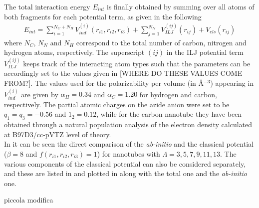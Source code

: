 \documentclass[utf8]{article}
\begin{document}
The total interaction energy $E_{int}$ is finally obtained by summing over all atoms of both fragments for each potential term, as given in the following
%
\begin{align}
    E_{int} = \sum_{i=1}^{N_C + N_H} V^{(i)}_{ind}(r_{i1},r_{i2},r_{i3}) +
              \sum_{j=1}^{N_N} V_{ILJ}^{(ij)}(r_{ij}) + V_{els}(r_{ij})
\end{align}
%
where $N_C$, $N_N$ and $N_H$ correspond to the total number of carbon, nitrogen and hydrogen atoms, respectively.
The superscript $(ij)$ in the ILJ potential term $V_{ILJ}^{(ij)}$ keeps track of the interacting atom types such that the parameters can be accordingly set to the values given in  [WHERE DO THESE VALUES COME FROM?].
The values used for the polarizability per volume (in \AA$^{-3}$) appearing in $V^(i)_{ind}$ are given by $\alpha_H = 0.34$ and $\alpha_C = 1.20$ for hydrogen and carbon, respectively.
The partial atomic charges on the azide anion were set to be $q_1 = q_3 = -0.56$ and $1_2 = 0.12$, while for the carbon nanotube they have been obtained through a natural population analysis\cite{Reed1985a} of the electron density calculated at B97D3/cc-pVTZ level of theory.\\

In  it can be seen the direct comparison of the \emph{ab-initio} and the classical potential ($\beta = 8$ and $f(r_{i1},r_{i2},r_{i3}) = 1$) for nanotubes with $\Lambda = 3,5,7,9,11,13$. 
The various components of the classical potential can also be considered separately, and these are listed in  and plotted in  along with the total one and the \emph{ab-initio} one.

piccola modifica

\clearpage




\clearpage
\end{document}
